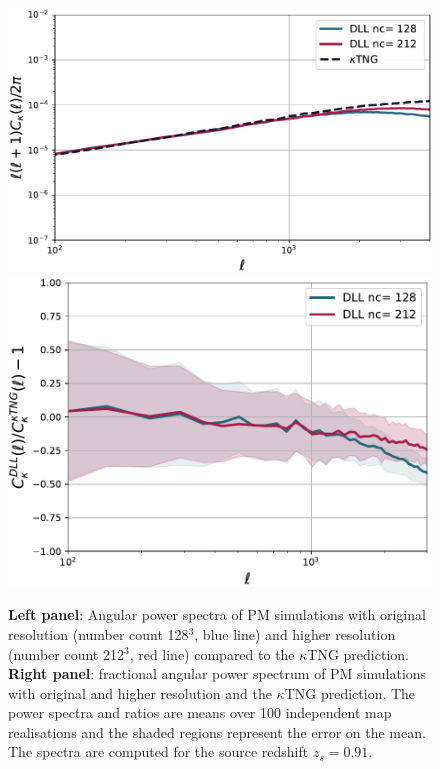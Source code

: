 \documentclass[twocolumn,twocolappendix]{aastex63}
\begin{document}
\renewcommand{\thefigure}{C\arabic{figure}}
\setcounter{figure}{0}
\begin{figure}
    \centering
    \includegraphics[width=\columnwidth]{paper/figures/cls_DLL_vs_ktng_high.pdf}
    \includegraphics[width=\columnwidth]{paper/figures/res_cls_DLL_vs_ktng_high.pdf}
    \caption{
    \textbf{Left panel}: Angular power spectra of PM simulations with original resolution (number count 128$^3$, blue line) and higher resolution (number count 212$^3$, red line) compared to the $\kappa$TNG prediction. \textbf{Right panel}: fractional angular power spectrum of PM simulations with original and higher resolution and the $\kappa$TNG prediction. The power spectra and ratios are means over 100 independent map realisations and the shaded regions represent the error on the mean. The spectra are computed for the source redshift $z_s=0.91$. 
}
    \label{fig:ps_comp_high}
\end{figure}
\end{document}
